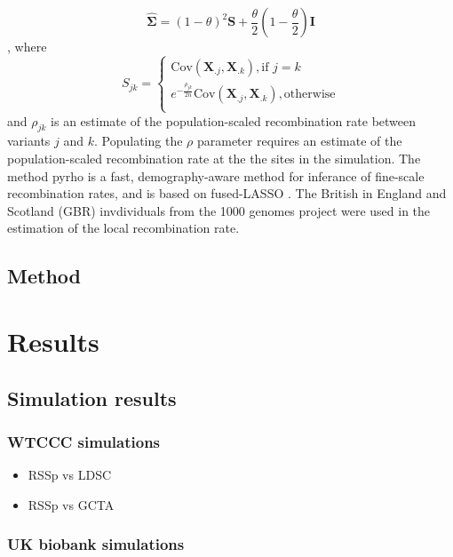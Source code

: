 $$\boldsymbol{\hat{\Sigma}} = (1-\theta)^2 \textbf{S}+\frac{\theta}{2} \left(1-\frac{\theta}{2}\right)\textbf{I}$$, where 
$$ S_{jk} = \begin{cases}
\text{Cov}(\boldsymbol{X}_{.j},\boldsymbol{X}_{.k}), \text{if } j=k \\
e^{-\frac{\rho_{jk}}{2n}}\text{Cov}(\boldsymbol{X}_{.j},\boldsymbol{X}_{.k}), \text{otherwise}\\
\end{cases} $$
and \(\rho_{jk}\) is an estimate of the population-scaled recombination rate between variants \(j\) and \(k\). Populating the \(\rho\) parameter requires an estimate
of the population-scaled recombination rate at the the sites in the simulation.  The method pyrho is a fast, demography-aware method for inferance of fine-scale recombination rates, and is based on
fused-LASSO \cite{Spence_2019}. The British in England and Scotland (GBR) invdividuals from the 1000 genomes project \cite{1kg} were used in the estimation of the local recombination rate.


\subsection{Method}\label{sec:org259b807}



\section{Results}\label{sec:org26555b8}


\subsection{Simulation results}\label{sec:orgdb752e7}

\subsubsection{WTCCC simulations}\label{sec:org75a6a66}

\begin{itemize}
\item RSSp vs LDSC\label{sec:org48df19d}

\item RSSp vs GCTA\label{sec:org43d585c}
\end{itemize}


\subsubsection{UK biobank simulations}\label{sec:org0fa2c7f}

